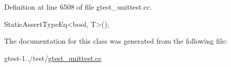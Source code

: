 \-Definition at line 6508 of file gtest\-\_\-unittest.\-cc.


\begin{DoxyCode}
{ StaticAssertTypeEq<bool, T>(); }
\end{DoxyCode}


\-The documentation for this class was generated from the following file\-:\begin{DoxyCompactItemize}
\item 
gtest-\/1../test/\hyperlink{gtest__unittest_8cc}{gtest\-\_\-unittest.\-cc}\end{DoxyCompactItemize}
